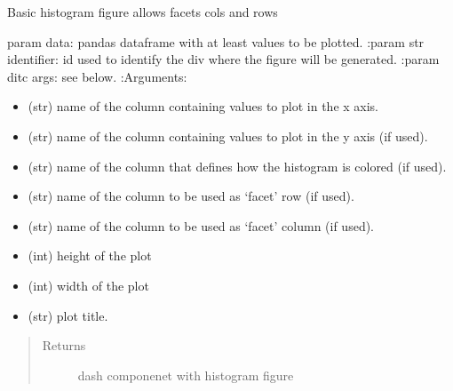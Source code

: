 \documentclass[letterpaper,10pt,english]{sphinxmanual}
\begin{document}
\begin{fulllineitems}
\label{\detokenize{_autosummary/analytics_core.viz:analytics_core.viz.viz.get_histogram}}
Basic histogram figure allows facets cols and rows

param data: pandas dataframe with at least values to be plotted.
:param str identifier: id used to identify the div where the figure will be generated.
:param ditc args: see below.
:Arguments:
\begin{itemize}
\item {} 
 (str) \textendash{} name of the column containing values to plot in the x axis.

\item {} 
 (str) \textendash{} name of the column containing values to plot in the y axis (if used).

\item {} 
 (str) \textendash{} name of the column that defines how the histogram is colored (if used).

\item {} 
 (str) \textendash{} name of the column to be used as ‘facet’ row (if used).

\item {} 
 (str) \textendash{} name of the column to be used as ‘facet’ column (if used).

\item {} 
 (int) \textendash{} height of the plot

\item {} 
 (int) \textendash{} width of the plot

\item {} 
 (str) \textendash{} plot title.

\end{itemize}
\begin{quote}\begin{description}
\item[{Returns}] \leavevmode
dash componenet with histogram figure

\end{description}\end{quote}


\end{fulllineitems}
\end{document}
